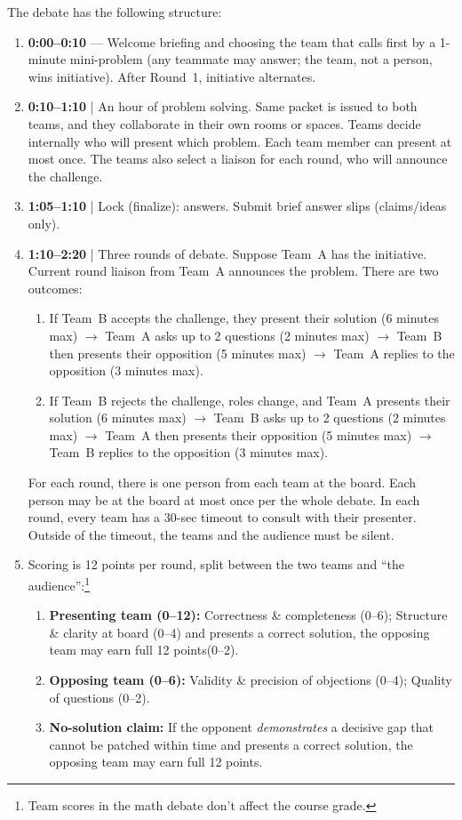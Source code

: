 \documentclass[oneside,11pt]{amsart}
\begin{document}
The debate has the following structure:
\begin{enumerate}[$\bullet$]
\item \textbf{0:00--0:10} --- Welcome briefing and choosing the 
team that calls first by
a
1-minute mini-problem (any teammate may answer; the team, not a person, wins initiative). After Round~1, initiative alternates.

\item \textbf{0:10--1:10} | An hour of problem solving. Same packet 
is issued to both teams, and they collaborate in their own rooms or spaces.
Teams decide internally who will present which problem. 
Each team member can present at most once.
The teams also select a liaison for each round, who will announce the challenge.

\item \textbf{1:05--1:10} | Lock (finalize): answers. Submit brief answer slips (claims/ideas only).

\item \textbf{1:10--2:20} |
Three rounds of debate.
Suppose Team~A has the initiative.
Current round liaison from Team~A
announces the problem.
There are two outcomes:
\begin{enumerate}
\item If Team~B accepts the challenge, they present their solution
(6 minutes max) $\to$
Team~A asks up to 2 questions (2 minutes max)
$\to$
Team~B then presents their opposition (5 minutes max)
$\to$
Team~A replies to the opposition (3 minutes max).
\item If Team~B rejects the challenge, roles change, and Team~A presents their solution (6 minutes max) $\to$
Team~B asks up to 2 questions (2 minutes max)
$\to$
Team~A then presents their opposition (5 minutes max)
$\to$
Team~B replies to the opposition (3 minutes max).
\end{enumerate}
For each round, there is one person from each team at the board. Each person
may be at the board at most once per the whole debate.
In each round, every team has a 30-sec timeout to consult with their presenter. Outside of the timeout, the teams and the audience must be silent.

\item Scoring is 12 points per round,
split between the two teams and ``the audience'':\footnote{Team scores 
in the math debate
don't affect the course grade.}
\begin{enumerate}
\item \textbf{Presenting team (0--12):} Correctness \& completeness (0--6); 
  Structure \& clarity at board (0--4) and presents a correct solution, the opposing team may earn full 12 points(0--2).
  \item \textbf{Opposing team (0--6):} Validity \& precision of objections (0--4);
  Quality of questions (0--2).
  \item \textbf{No-solution claim:} If the opponent \emph{demonstrates} a decisive gap that cannot be patched within time and presents a correct solution, the opposing team may earn full 12 points.
\end{enumerate}


\end{enumerate}
\end{document}
